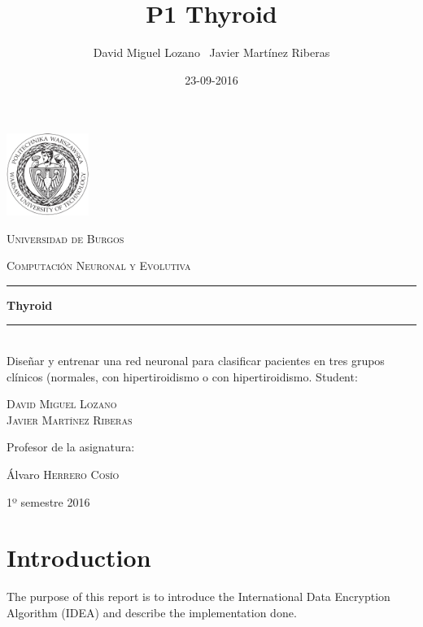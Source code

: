 \documentclass[a4paper,12pt,titlepage]{article}
\newcommand{\HRule}[1]{\rule{\linewidth}{#1}}
\begin{document}
\author{David Miguel Lozano \ Javier Martínez Riberas}
\title{P1 Thyroid}
\date{23-09-2016}

\begin{titlepage}
	\centering
	\includegraphics[width=0.2\textwidth]{images/pw-logo.png}\par
	\vspace{0.3cm}
	{\scshape\LARGE Universidad de Burgos \par}
	\vfill
	{\scshape\Large Computación Neuronal y Evolutiva \par}
	\HRule{2pt}
	{\huge\bfseries Thyroid \par}
	\HRule{2pt}
	\\ [0.5cm]
	{Diseñar y entrenar una red neuronal para clasificar pacientes en tres grupos clínicos (normales, con hipertiroidismo o con hipertiroidismo.}
	\vfill
	Student:\par
	{\Large\scshape David Miguel Lozano \\ Javier Martínez Riberas \par}
	\vfill
	Profesor de la asignatura:\par
	Álvaro \textsc{Herrero Cosío}
	\vfill
	{\large 1º semestre 2016 \par}
\end{titlepage}

\newpage
\tableofcontents
\begin{appendix}
  \listoffigures
\end{appendix}

\newpage

\section{Introduction}

The purpose of this report is to introduce the International Data Encryption Algorithm (IDEA) and describe the implementation done.
\end{document}
